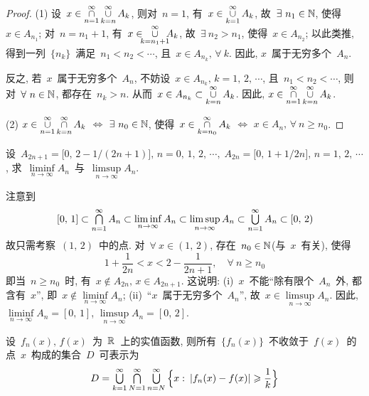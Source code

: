 \begin{proof}
(1) 设~$x \in \mathop{\cap}^\infty \limits_{n=1} \mathop{\cup}^\infty \limits_{k=n} A_k$, 则对~$n = 1$, 有~$x \in \mathop{\cup}^\infty \limits_{k=1} A_k$, 故~$\exists~ n_1 \in \mathbb{N}$, 使得~$x \in A_{n_1}$; 对~$n = n_1 + 1$, 有~$x \in \!\!\! \mathop{\cup}^\infty \limits_{k=n_1 + 1} \!\!\! A_k$, 故~$\exists~ n_2 > n_1$, 使得~$x \in A_{n_2}$; 以此类推, 得到一列~$\{n_k\}$~满足~$n_1 < n_2 < \cdots$, 且~$x \in A_{n_k}, \, \forall~k$. 因此, $x$~属于无穷多个~$A_n$.

反之, 若~$x$~属于无穷多个~$A_n$, 不妨设~$x \in A_{n_k}, \, k =1,\,2,\,\cdots$, 且~$n_1 < n_2 < \cdots$,
则对~$\forall~n \in \mathbb{N}$, 都存在~$n_k > n$. 从而~$x \in A_{n_k} \subset \mathop{\cup}^\infty \limits_{k = n} A_k$. 因此, $x \in \mathop{\cap}^\infty \limits_{n=1} \mathop{\cup}^\infty \limits_{k=n} A_k$.

(2) $x \in \mathop{\cup}^\infty \limits_{n=1} \mathop{\cap}^\infty \limits_{k=n} A_k$ $\Longleftrightarrow$ $\exists~n_0 \in \mathbb{N}$, 使得~$x \in \mathop{\cap}^\infty \limits_{k=n_0} A_k$ $\Longleftrightarrow$ $x \in A_n, \, \forall~ n \geqslant n_0$. 
\end{proof}

\medskip

\begin{example}
设~$A_{2n +1} = \big[0,\,2-1/(2n+1)\big], \, n = 0,\,1,\,2,\,\cdots, \; A_{2n} = \big[0,\,1+1/2n\big], \, n = 1,\,2,\,\cdots$, 求~$\liminf \limits_{n \to \infty} A_n$~与~$\limsup \limits_{n \to \infty} A_n$.
\end{example}

\begin{solution}
注意到
\[
[0,\,1] \subset \mathop{\textstyle{\bigcap}}^\infty _{n=1} A_n \subset \liminf \limits_{n \to \infty} A_n \subset \limsup \limits_{n \to \infty} A_n \subset \mathop{\textstyle{\bigcup}}^\infty _{n=1} A_n \subset [0,\,2)
\]
故只需考察~$(1,\,2)$~中的点. 对~$\forall~x \in (1,\,2)$, 存在~$n_0 \in \mathbb{N}$(与~$x$~有关), 使得
\[
1+ \frac{1}{2n} < x < 2- \frac{1}{2n+1}, \quad \forall~ n \geqslant n_0
\]
即当~$n \geqslant n_0$~时, 有~$x \notin A_{2n}, \, x \in A_{2n+1}$. 这说明: (i)~$x$~不能``除有限个~$A_n$~外, 都含有~$x$'', 即~$x \notin \liminf \limits_{n \to \infty} A_n$; (ii)~``$x$~属于无穷多个~$A_n$'', 故~$x \in \limsup \limits_{n \to \infty} A_n$. 因此, $\liminf \limits_{n \to \infty} A_n = [0,\,1]$, $\limsup \limits_{n \to \infty} A_n = [0,\,2]$.
\end{solution}

\medskip

\begin{example} \label{ex112} 设~$f_n(x),\,f(x)$~为~$\mathbb{R}$~上的实值函数, 则所有~$\{f_n(x)\}$~不收敛于~$f(x)$~的
点~$x$~构成的集合~$D$~可表示为
\[
D = \mathop{\textstyle{\bigcup}}^\infty _{k=1} \mathop{\textstyle{\bigcap}}^\infty _{N=1} \mathop{\textstyle{\bigcup}}^\infty _{n=N} \Big\{x: \: |f_n(x)-f(x)| \geqslant \frac{1}{k}\Big\}
\]
\end{example}

